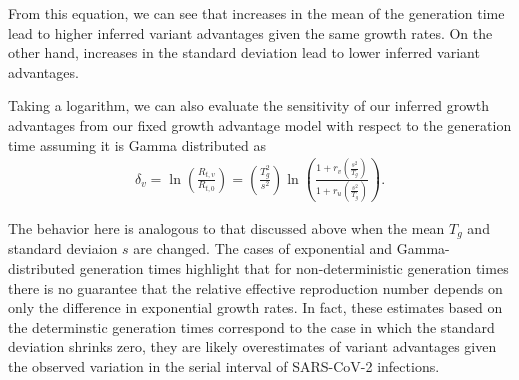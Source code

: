 \documentclass[11pt,oneside,letterpaper]{article}
\begin{document}
From this equation, we can see that increases in the mean of the generation time lead to higher inferred variant advantages given the same growth rates. On the other hand, increases in the standard deviation lead to lower inferred variant advantages.

Taking a logarithm, we can also evaluate the sensitivity of our inferred growth advantages from our fixed growth advantage model with respect to the generation time assuming it is Gamma distributed as
\begin{align*}
 \delta_{v}  = \ln \left( \frac{R_{t,v}}{R_{t,0}} \right) = \left( \frac{T_{g}^{2}}{s^{2}} \right)  \ln \left( \frac{1 + r_{v}  \left(\frac{s^{2}}{T_{g}}\right)}{1 + r_{u} \left(\frac{s^{2}}{T_{g}}\right) } \right).
\end{align*}

The behavior here is analogous to that discussed above when the mean $T_{g}$ and standard deviaion $s$ are changed.
The cases of exponential and Gamma-distributed generation times highlight that for non-deterministic generation times there is no guarantee that the relative effective reproduction number depends on only the difference in exponential growth rates. 
In fact, these estimates based on the determinstic generation times correspond to the case in which the standard deviation shrinks zero, they are likely overestimates of variant advantages given the observed variation in the serial interval of SARS-CoV-2 infections.



\end{document}
